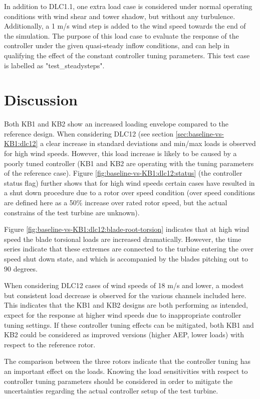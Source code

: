 In addition to DLC1.1, one extra load case is considered under normal operating conditions with wind shear and tower shadow, but without any turbulence. Additionally, a 1 m/s wind step is added to the wind speed towards the end of the simulation. The purpose of this load case to evaluate the response of the controller under the given quasi-steady inflow conditions, and can help in qualifying the effect of the constant controller tuning parameters. This test case is labelled as "test\_steadysteps".


\section{Discussion}
\label{sec:dlb:discussion}

Both KB1 and KB2 show an increased loading envelope compared to the reference design. When considering DLC12 (see section \ref{sec:baseline-vs-KB1:dlc12} a clear increase in standard deviations and min/max loads is observed for high wind speeds. However, this load increase is likely to be caused by a poorly tuned controller (KB1 and KB2 are operating with the tuning parameters of the reference case). Figure \ref{fig:baseline-vs-KB1:dlc12:status} (the controller status flag) further shows that for high wind speeds certain cases have resulted in a shut down procedure due to a rotor over speed condition (over speed conditions are defined here as a 50\% increase over rated rotor speed, but the actual constrains of the test turbine are unknown).

Figure \ref{fig:baseline-vs-KB1:dlc12:blade-root-torsion} indicates that at high wind speed the blade torsional loads are increased dramatically. However, the time series indicate that these extremes are connected to the turbine entering the over speed shut down state, and which is accompanied by the blades pitching out to 90 degrees.

When considering DLC12 cases of wind speeds of 18 m/s and lower, a modest but consistent load decrease is observed for the various channels included here. This indicates that the KB1 and KB2 designs are both performing as intended, expect for the response at higher wind speeds due to inappropriate controller tuning settings. If these controller tuning effects can be mitigated, both KB1 and KB2 could be considered as improved versions (higher AEP, lower loads) with respect to the reference rotor.

The comparison between the three rotors indicate that the controller tuning has an important effect on the loads. Knowing the load sensitivities with respect to controller tuning parameters should be considered in order to mitigate the uncertainties regarding the actual controller setup of the test turbine.


